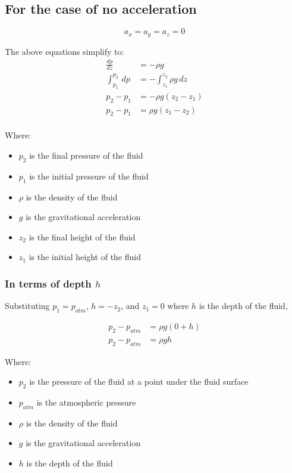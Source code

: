 \documentclass[11pt]{article}
\begin{document}
\subsection{For the case of no acceleration}
\label{sec:orge1f3e51}
\[a_x = a_y = a_z = 0\]

The above equations simplify to:
\begin{align*}
\frac{dp}{dz} &= - \rho g \\
\int_{p_1}^{p_2} \, dp &= - \int_{z_1}^{z_2} \rho g \, dz \\
p_2 - p_1 &= - \rho g (z_2 - z_1) \\
p_2 - p_1 &= \rho g (z_1 - z_2) \\
\end{align*}

Where:
\begin{itemize}
\item \(p_2\) is the final pressure of the fluid
\item \(p_1\) is the initial pressure of the fluid
\item \(\rho\) is the density of the fluid
\item \(g\) is the gravitational acceleration
\item \(z_2\) is the final height of the fluid
\item \(z_1\) is the initial height of the fluid
\end{itemize}

\subsubsection{In terms of depth \(h\)}
\label{sec:org64186b5}
Substituting \(p_1 = p_{atm}\), \(h = - z_2\), and \(z_1 = 0\) where \(h\) is the depth of the fluid,

\begin{align*}
p_2 - p_{atm} &= \rho g (0 + h) \\
p_2 - p_{atm} &= \rho g h
\end{align*}

Where:
\begin{itemize}
\item \(p_2\) is the pressure of the fluid at a point under the fluid surface
\item \(p_{atm}\) is the atmospheric pressure
\item \(\rho\) is the density of the fluid
\item \(g\) is the gravitational acceleration
\item \(h\) is the depth of the fluid
\end{itemize}
\end{document}
